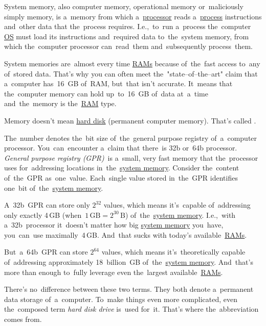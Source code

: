 \label{systemmemory}
System memory, also computer memory, operational memory or~maliciously simply memory, is a~memory from which a~\hyperref[processorcpucore]{processor} reads a~\hyperref[applicationprocessprogramservicethread]{process} instructions and~other data that the~process requires.
I.e.,~to~run a~process the~computer \hyperref[os]{OS} must load its instructions and~required data to~the~system memory, from which the~computer processor can~read~them and~subsequently process~them.

System memories are~almost every time \hyperref[ram]{RAMs} because of~the~fast access to~any of~stored data.
That's why you can often meet the~"state--of--the--art" claim that a~computer has~16~GB of~RAM, but~that isn't accurate.
It~means that the~computer memory can hold up~to~16~GB of~data at~a~time and~the~memory is the~\hyperref[ram]{RAM} type.

\warning Memory doesn't mean \hyperref[harddiskdrive]{hard disk} (permanent computer memory).
That's called \hyperref[harddiskdrive]{}.

\label{32bvs64b}
The~number denotes the~bit size of~the~general purpose registry of~a~computer processor.
You~can~encounter a~claim that there~is 32b or~64b processor.
\textit{General purpose registry (GPR)}~is a~small, very fast memory that the~processor uses for~addressing locations in~the~\hyperref[systemmemory]{system memory}.
Consider the~content of~the~GPR as~one~value.
Each~single value stored in~the~GPR identifies one~bit of~the~\hyperref[systemmemory]{system memory}.

A~32b~GPR can store only $2^{32}$ values, which means it's~capable of~addressing only exactly 4\,GB (when~$1\,\textrm{GB}=2^{30}\,\textrm{B}$) of~the~\hyperref[systemmemory]{system memory}.
I.e.,~with a~32b~processor it~doesn't matter how big \hyperref[systemmemory]{system memory} you~have, you~can~use maximally~4\,GB\@.
And~that sucks with today's available~\hyperref[ram]{RAMs}.

But~a~64b~GPR can store $2^{64}$ values, which means it's~theoretically capable of~addressing approximately 18~billion~GB of~the~\hyperref[systemmemory]{system memory}.
And~that's more than enough to~fully leverage even the~largest available~\hyperref[ram]{RAMs}.

\label{harddiskdrive}
There's no~difference between these two terms.
They both denote a~permanent data storage of~a~computer.
To~make things even more complicated, even the~composed term \textit{hard disk drive} is~used for~it.
That's where the~abbreviation  comes from.

